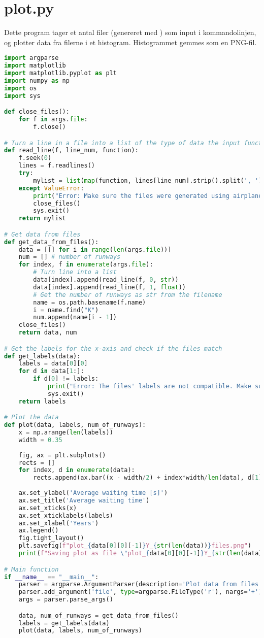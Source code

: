 \section{plot.py}
Dette program tager et antal filer (genereret med ) som input i kommandolinjen, og plotter data fra filerne i et histogram.
Histogrammet gemmes som en \textsc{PNG}-fil.

\begin{lstlisting}[language=Python, caption={plot.py}]
import argparse
import matplotlib
import matplotlib.pyplot as plt
import numpy as np
import os
import sys

def close_files():
    for f in args.file:
        f.close()

# Turn a line in a file into a list of the type of data the input function returns
def read_line(f, line_num, function):
    f.seek(0)
    lines = f.readlines()
    try:
        mylist = list(map(function, lines[line_num].strip().split(', ')))
    except ValueError:
        print("Error: Make sure the files were generated using airplanes.py.")
        close_files()
        sys.exit()
    return mylist

# Get data from files
def get_data_from_files():
    data = [[] for i in range(len(args.file))]
    num = [] # number of runways
    for index, f in enumerate(args.file):
        # Turn line into a list
        data[index].append(read_line(f, 0, str))
        data[index].append(read_line(f, 1, float))
        # Get the number of runways as str from the filename
        name = os.path.basename(f.name)
        i = name.find("K")
        num.append(name[i - 1])
    close_files()
    return data, num

# Get the labels for the x-axis and check if the files match
def get_labels(data):
    labels = data[0][0]
    for d in data[1:]:
        if d[0] != labels:
            print("Error: The files' labels are not compatible. Make sure the number of years in each file is the same.")
            sys.exit()
    return labels

# Plot the data
def plot(data, labels, num_of_runways):
    x = np.arange(len(labels))
    width = 0.35
    
    fig, ax = plt.subplots()
    rects = []
    for index, d in enumerate(data):
        rects.append(ax.bar((x - width/2) + index*width/len(data), d[1], width, label=(num_of_runways[index] + " runways")))
    
    ax.set_ylabel('Average waiting time [s]')
    ax.set_title('Average waiting time')
    ax.set_xticks(x)
    ax.set_xticklabels(labels)
    ax.set_xlabel('Years')
    ax.legend()
    fig.tight_layout()
    plt.savefig(f"plot_{data[0][0][-1]}Y_{str(len(data))}files.png")
    print(f"Saving plot as file \"plot_{data[0][0][-1]}Y_{str(len(data))}files.png\"")

# Main function
if __name__ == "__main__":
    parser = argparse.ArgumentParser(description='Plot data from files in a bar graph')
    parser.add_argument('file', type=argparse.FileType('r'), nargs='+')
    args = parser.parse_args()

    data, num_of_runways = get_data_from_files()
    labels = get_labels(data)
    plot(data, labels, num_of_runways)
\end{lstlisting}
